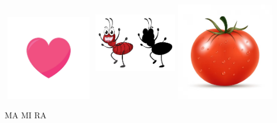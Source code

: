 \includegraphics[width=1.56319in,height=1.45278in]{media/image67.png}
\includegraphics[width=1.42083in,height=1.99583in]{media/image68.png}
\includegraphics[width=1.67778in,height=1.67778in]{media/image69.png}

MA MI RA




